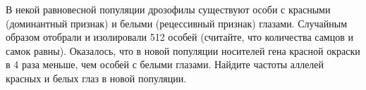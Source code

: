 В некой равновесной популяции дрозофилы существуют особи с красными (доминантный признак) и белыми (рецессивный признак) глазами. Случайным образом отобрали и изолировали 512 особей (считайте, что количества самцов и самок равны). Оказалось, что в новой популяции носителей гена красной окраски в 4 раза меньше, чем особей с белыми глазами. Найдите частоты аллелей красных и белых глаз в новой популяции.